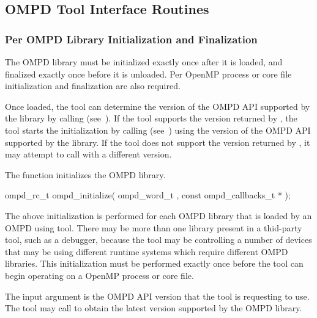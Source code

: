 
\subsection{OMPD Tool Interface Routines}
\label{subsec:ompd-api}

\subsubsection{Per OMPD Library Initialization and Finalization}

The OMPD library must be initialized exactly once after it is loaded, and finalized exactly once
before it is unloaded. Per OpenMP process or core file initialization and finalization are also required.

Once loaded, the tool can determine the version of the OMPD API supported by the
library by calling  (see~). If the tool supports the version returned by ,
the tool starts the initialization by calling  (see~) using the version
of the OMPD API supported by the library.  If the tool does not support the version returned by , it may attempt to call  with
a different version.


\label{subsubsubsec:ompd_initialize}

\summary
The  function initializes the OMPD library.

\format

\begin{cspecific}
\begin{ompSyntax}
ompd_rc_t ompd_initialize(
  ompd_word_t ,
  const ompd_callbacks_t *
);
\end{ompSyntax}
\end{cspecific}

\descr
The above initialization is performed for each OMPD library that is loaded by an OMPD using tool.
There may be more than one library present in a thid-party tool, such as a debugger, because the tool
may be controlling a number of devices that may be using different runtime systems which require
different OMPD libraries. This initialization must be performed exactly once before the tool
can begin operating on a OpenMP process or core file.

\argdesc
The  input argument is the OMPD API version that the tool is requesting to use.
The tool may call  to obtain the latest version supported by the OMPD library.

